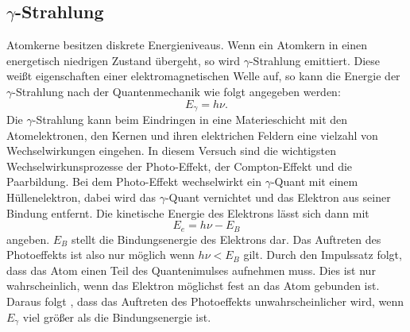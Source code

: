 \subsection{\texorpdfstring{$\gamma$}{Gamma}-Strahlung}
Atomkerne besitzen diskrete Energieniveaus.
Wenn ein Atomkern in einen energetisch niedrigen Zustand übergeht, so wird $\gamma$-Strahlung emittiert.
Diese weißt eigenschaften einer elektromagnetischen Welle auf, so kann die Energie der $\gamma$-Strahlung
nach der Quantenmechanik wie folgt angegeben werden:
\begin{equation}
  E_\gamma = h\nu  .
\end{equation}
Die $\gamma$-Strahlung kann beim Eindringen in eine Materieschicht mit den Atomelektronen, den Kernen und ihren elektrichen Feldern eine vielzahl von Wechselwirkungen eingehen.
In diesem Versuch sind die wichtigsten Wechselwirkunsprozesse der Photo-Effekt, der Compton-Effekt und die Paarbildung.
Bei dem Photo-Effekt wechselwirkt ein $\gamma$-Quant mit einem Hüllenelektron, dabei wird das $\gamma$-Quant vernichtet und das Elektron aus seiner Bindung entfernt.
Die kinetische Energie des Elektrons lässt sich dann mit
\begin{equation}
  E_e = h\nu - E_B
\end{equation}
angeben.
$E_B$ stellt die Bindungsenergie des Elektrons dar.
Das Auftreten des Photoeffekts ist also nur möglich wenn $h\nu < E_B$ gilt.
Durch den Impulssatz folgt, dass das Atom einen Teil des Quantenimulses aufnehmen muss.
Dies ist nur wahrscheinlich, wenn das Elektron möglichst fest an das Atom gebunden ist.
Daraus folgt , dass das Auftreten des Photoeffekts unwahrscheinlicher wird, wenn $E_\gamma$  viel größer als die Bindungsenergie ist.

